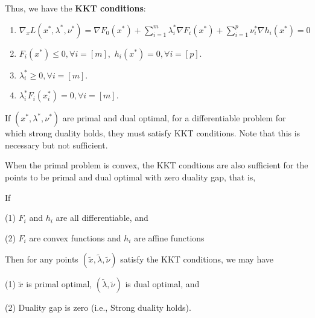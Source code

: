 Thus, we have the \textbf{KKT conditions}:
\begin{enumerate}
	\item $\nabla_x L(x^*,\lambda^*,\nu^*) = \nabla F_0(x^*)+\sum^m_{i=1}\lambda^*_i \nabla F_i(x^*)+\sum^p_{i=1}\nu_i^*\nabla h_i(x^*)=0$
	
	\item $F_i(x^*) \leq 0,\forall i=[m]$,\  $h_i(x^*)=0,\forall i=[p]$.
	
	\item $\lambda_i^*\geq 0,\forall i=[m]$.
	
	\item $\lambda_i^*F_i(x_i^*)= 0,\forall i=[m]$.
\end{enumerate}

\begin{theorem}\label{kktnecessary}
	If $(x^*,\lambda^*,\nu^*)$ are primal and dual optimal, for a differentiable problem for which strong duality holds, they must satisfy KKT conditions. Note that this is necessary but not sufficient.
\end{theorem}


\begin{theorem}\label{kktsufficient}
	When the primal problem is convex, the KKT condtions are also sufficient for the points to be primal and dual optimal with zero duality gap, that is, 
	
	If
	
		(1) $F_i$ and $h_i$ are all differentiable, and
		
		(2) $F_i$ are convex functions and $h_i$ are affine functions
	
	Then for any points $(\tilde{x},\tilde{\lambda},\tilde{\nu})$ satisfy the KKT conditions, we may have
		
	 	(1)	$\tilde{x}$ is primal optimal, $(\tilde{\lambda},\tilde{\nu})$ is  dual optimal, and
	 	
	 	(2) Duality gap is zero (i.e., Strong duality holds).
	 	

\end{theorem}

